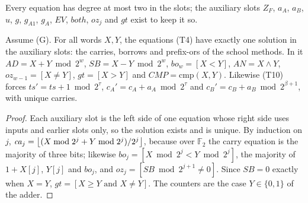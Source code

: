 Every equation has degree at most two in the slots; the auxiliary slots
\(Z_F\), \(a_A\), \(a_B\), \(u\), \(g\), \(g_{A1}\), \(g_A\),
\(\mathit{EV}\), \(\mathit{both}\), \(\mathit{oz}_j\) and \(\mathit{gt}\)
exist to keep it so.

\begin{lemma}[Gadgets]\label{earlier:r:lem:trace-gadgets}
Assume (G). For all words \(X,Y\), the equations (T4) have exactly one
solution in the auxiliary slots: the carries, borrows and prefix-ors of
the school methods. In it \(\mathit{AD}=X+Y\bmod2^w\),
\(\mathit{SB}=X-Y\bmod2^w\), \(\mathit{bo}_w=[X<Y]\),
\(\mathit{AN}=X\wedge Y\), \(\mathit{oz}_{w-1}=[X\ne Y]\),
\(\mathit{gt}=[X>Y]\) and \(\mathit{CMP}=\mathrm{cmp}(X,Y)\). Likewise
(T10) forces \(\mathit{ts}'=\mathit{ts}+1\bmod2^\tau\),
\(c_A'=c_A+a_A\bmod2^\tau\) and \(c_B'=c_B+a_B\bmod2^{\beta+1}\), with
unique carries.
\end{lemma}
\begin{proof}
Each auxiliary slot is the left side of one equation whose right side
uses inputs and earlier slots only, so the solution exists and is
unique. By induction on \(j\),
\(\mathit{ca}_j=\left\lfloor(X\bmod2^j+Y\bmod2^j)/2^j\right\rfloor\), because over
\(\mathbb F_2\) the carry equation is the majority of three bits;
likewise \(\mathit{bo}_j=[X\bmod2^j<Y\bmod2^j]\), the majority of
\(1+X[j]\), \(Y[j]\) and \(\mathit{bo}_j\), and
\(\mathit{oz}_j=[\mathit{SB}\bmod2^{j+1}\ne0]\). Since \(\mathit{SB}=0\)
exactly when \(X=Y\), \(\mathit{gt}=[X\ge Y\text{ and }X\ne Y]\). The
counters are the case \(Y\in\{0,1\}\) of the adder.
\end{proof}

